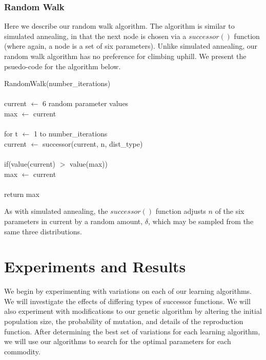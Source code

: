 \documentclass[12pt]{article}
\begin{document}
\subsubsection{Random Walk}

Here we describe our random walk algorithm.  The algorithm is similar to
simulated annealing, in that the next node is chosen via a $successor()$
function (where again, a node is a set of six parameters). Unlike simulated
annealing, our random walk algorithm has no preference for climbing uphill. We
present the psuedo-code for the algorithm below.

\vspace{10pt}
\setlength{\parindent}{5mm}
\indent RandomWalk(number\_iterations)\\\\
\indent \indent current $\leftarrow$ 6 random parameter values\\
\indent \indent max $\leftarrow$ current\\\\
\indent \indent for t $\leftarrow$ 1 to number\_iterations\\
\indent \indent \indent current $\leftarrow$ successor(current, n, dist\_type)\\\\
\indent \indent \indent if(value(current) $>$ value(max))\\
\indent \indent \indent \indent max $\leftarrow$ current\\\\
\indent \indent return max\\
\setlength{\parindent}{0mm}

As with simulated annealing, the $successor()$ function adjusts $n$ of the six
parameters in current by a random amount, $\delta$, which may be sampled from
the same three distributions.



\section{Experiments and Results}


We begin by experimenting with variations on each of our learning algorithms. We
will investigate the effects of differing types of successor functions. We will
also experiment with modifications to our genetic algorithm by altering
the initial population size, the probability of mutation, and details of the
reproduction function. After determining the best set of variations for each
learning algorithm, we will use our algorithms to search for the optimal
parameters for each commodity.
\end{document}
